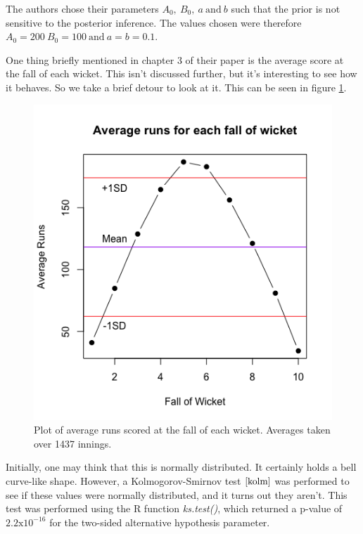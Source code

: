 The authors chose their parameters $A_0, \ B_0, \ a \ \text{and} \ b$ such that the prior is not sensitive to the posterior inference. The values chosen
were therefore $A_0=200 \ B_0=100 \ \text{and} \ a=b=0.1$.

One thing briefly mentioned in chapter 3 of their paper is the average score at the fall of each wicket. This isn't discussed further, but it's interesting to see how it behaves.
So we take a brief detour to look at it. This can be seen in figure \ref{avgrunsfow}.

\begin{figure}[h]
    \centering
    \includegraphics[scale=0.6]{figures/avgrunsfow.png}
    \caption{Plot of average runs scored at the fall of each wicket. Averages taken over 1437 innings.}
    \label{avgrunsfow}
\end{figure}
Initially, one may think that this is normally distributed. It certainly holds a bell curve-like shape. However, a Kolmogorov-Smirnov test $\cite{kolm}$ was
performed to see if these values were normally distributed, and it turns out they aren't. This test was performed using the R function \textit{ks.test()}, which returned
a p-value of $2.2\text{x}10^{-16}$ for the two-sided alternative hypothesis parameter. \\

